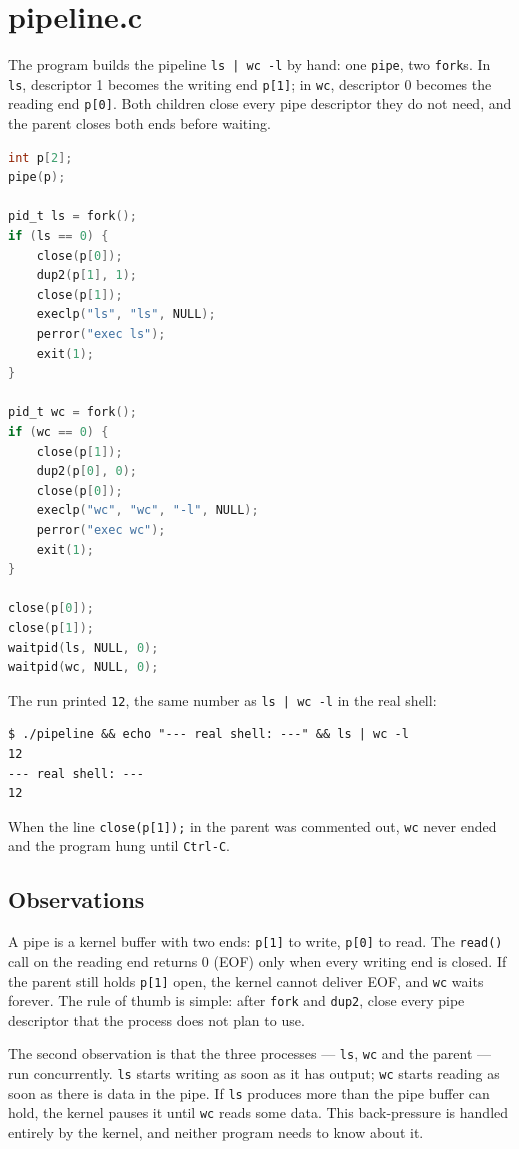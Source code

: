 \documentclass[12pt,a4paper]{article}
\begin{document}
\section{pipeline.c}

The program builds the pipeline \texttt{ls | wc -l} by hand: one \texttt{pipe}, two \texttt{fork}s. In \texttt{ls}, descriptor 1 becomes the writing end \texttt{p[1]}; in \texttt{wc}, descriptor 0 becomes the reading end \texttt{p[0]}. Both children close every pipe descriptor they do not need, and the parent closes both ends before waiting.

\begin{lstlisting}[language=C]
int p[2];
pipe(p);

pid_t ls = fork();
if (ls == 0) {
    close(p[0]);
    dup2(p[1], 1);
    close(p[1]);
    execlp("ls", "ls", NULL);
    perror("exec ls");
    exit(1);
}

pid_t wc = fork();
if (wc == 0) {
    close(p[1]);
    dup2(p[0], 0);
    close(p[0]);
    execlp("wc", "wc", "-l", NULL);
    perror("exec wc");
    exit(1);
}

close(p[0]);
close(p[1]);
waitpid(ls, NULL, 0);
waitpid(wc, NULL, 0);
\end{lstlisting}

The run printed \texttt{12}, the same number as \texttt{ls | wc -l} in the real shell:

\begin{lstlisting}
$ ./pipeline && echo "--- real shell: ---" && ls | wc -l
12
--- real shell: ---
12
\end{lstlisting}

When the line \texttt{close(p[1]);} in the parent was commented out, \texttt{wc} never ended and the program hung until \texttt{Ctrl-C}.

\subsection{Observations}

A pipe is a kernel buffer with two ends: \texttt{p[1]} to write, \texttt{p[0]} to read. The \texttt{read()} call on the reading end returns 0 (EOF) only when every writing end is closed. If the parent still holds \texttt{p[1]} open, the kernel cannot deliver EOF, and \texttt{wc} waits forever. The rule of thumb is simple: after \texttt{fork} and \texttt{dup2}, close every pipe descriptor that the process does not plan to use.

The second observation is that the three processes --- \texttt{ls}, \texttt{wc} and the parent --- run concurrently. \texttt{ls} starts writing as soon as it has output; \texttt{wc} starts reading as soon as there is data in the pipe. If \texttt{ls} produces more than the pipe buffer can hold, the kernel pauses it until \texttt{wc} reads some data. This back-pressure is handled entirely by the kernel, and neither program needs to know about it.
\end{document}

